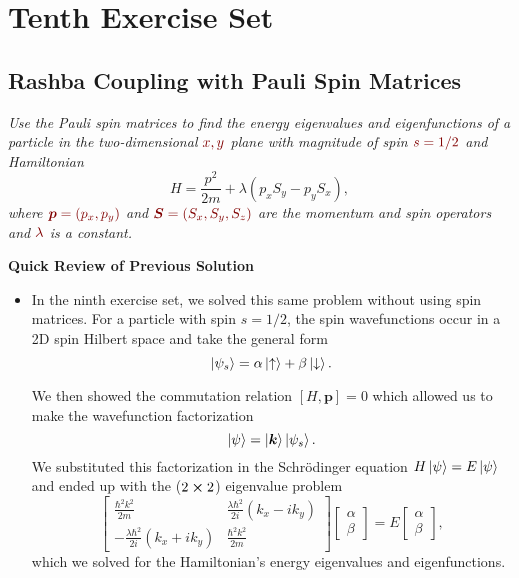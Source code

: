 \documentclass[11pt, a4paper]{article}
\newcommand{\dmath}[1]{\textcolor{Maroon}{#1}}  %
\newcommand{\Schro}{Schr\"{o}dinger\xspace}
\renewcommand{\vec}[1]{\bm{#1}} %
\newcommand{\ua}{\uparrow}  %
\newcommand{\da}{\downarrow}  %
\begin{document}
\section{Tenth Exercise Set}

\subsection{Rashba Coupling with Pauli Spin Matrices}
\textit{Use the Pauli spin matrices to find the energy eigenvalues and eigenfunctions of a particle in the two-dimensional $ \dmath{x, y} $ plane with magnitude of spin $ \dmath{s = 1/2} $ and Hamiltonian}
\begin{equation*}
	H = \frac{p^{2}}{2m} + \lambda (p_{x}S_{y} - p_{y}S_{x}),
\end{equation*}
\textit{where $ \dmath{\vec{p} = (p_{x}, p_{y})} $ and $ \dmath{\vec{S} = (S_{x}, S_{y}, S_{z})} $ are the momentum and spin operators and $ \dmath{\lambda} $ is a constant.}


\vspace{2mm}
\textbf{Quick Review of Previous Solution}
\begin{itemize}
	\item In the ninth exercise set, we solved this same problem without using spin matrices. For a particle with spin $ s = 1/2 $, the spin wavefunctions occur in a 2D spin Hilbert space and take the general form
	\begin{equation*}
		\ket{\psi_{s}} = \alpha \ket{\ua} + \beta \ket{\da}.
	\end{equation*}
	
	We then showed the commutation relation $ [H, \vec{p}] = 0 $ which allowed us to make the wavefunction factorization
	\begin{equation*}
		\ket{\psi} = \ket{\vec{k}}\ket{\psi_{s}}.
	\end{equation*}
	We substituted this factorization in the \Schro equation $ H \ket{\psi} = E \ket{\psi} $ and ended up with the ($ 2 \cross 2 $) eigenvalue problem
	\begin{equation*}
		\begin{bmatrix}
		\frac{\hbar^{2}k^{2}}{2m} & \frac{\lambda \hbar^{2}}{2i}(k_{x}-ik_{y}) \\
		-\frac{\lambda \hbar^{2}}{2i}(k_{x}+ik_{y}) & \frac{\hbar^{2}k^{2}}{2m}
		\end{bmatrix}
		\begin{bmatrix}
			\alpha\\
			\beta
		\end{bmatrix}
		= E
		\begin{bmatrix}
			\alpha\\
			\beta
		\end{bmatrix},
	\end{equation*}
	which we solved for the Hamiltonian's energy eigenvalues and eigenfunctions.
\end{itemize}
\end{document}

